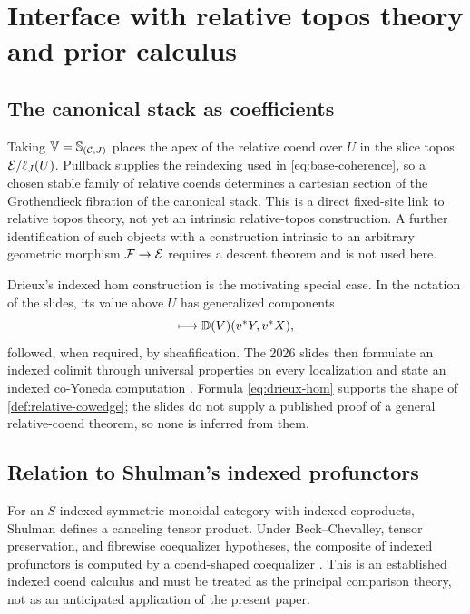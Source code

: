 \section{Interface with relative topos theory and prior calculus}
\label{sec:interface}

\subsection{The canonical stack as coefficients}

Taking \(\mathbb{V}=\mathbb{S}_{(\mathcal{C},J)}\) places the apex of the relative coend over
\(U\) in the slice topos \(\mathcal{E}/\ell_J(U)\).  Pullback supplies the reindexing
used in \cref{eq:base-coherence}, so a chosen stable family of relative
coends determines a cartesian section of the Grothendieck fibration of the
canonical stack.  This is a direct fixed-site link to relative topos theory,
not yet an intrinsic relative-topos construction.  A further
identification of such objects with a construction
intrinsic to an arbitrary geometric morphism \(\mathcal F\to\mathcal{E}\) requires a
descent theorem and is not used here.

Drieux's indexed hom construction is the motivating special case.  In the
notation of the slides, its value above \(U\) has generalized components
\begin{equation}
  [v:V\to U]\longmapsto
  \D(V)(v^*Y,v^*X),
  \label{eq:drieux-hom}
\end{equation}
followed, when required, by sheafification.  The 2026 slides then formulate an
indexed colimit through universal properties on every localization and state
an indexed co-Yoneda computation
\cite[logical slides~13--20]{Drieux2026LHC}
\cite[logical slides~13--22]{Drieux2026TACL}.  Formula
\cref{eq:drieux-hom} supports the shape of
\cref{def:relative-cowedge}; the slides do not supply a published proof of a
general relative-coend theorem, so none is inferred from them.

\subsection{Relation to Shulman's indexed profunctors}

For an \(S\)-indexed symmetric monoidal category with indexed coproducts,
Shulman defines a canceling tensor product.  Under Beck--Chevalley, tensor
preservation, and fibrewise coequalizer hypotheses, the composite of indexed
profunctors is computed by a coend-shaped coequalizer
\cite[Definition~2.4, Definition~2.10, and Lemma~3.25, pp.~7--8 and
21--22]{Shulman2013}.
This is an established indexed coend calculus and must be treated as the
principal comparison theory, not as an anticipated application of the
present paper.

